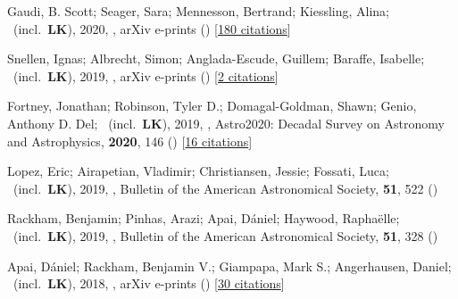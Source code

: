 \item[{\color{numcolor}\scriptsize9}] Gaudi, B. Scott; Seager, Sara; Mennesson, Bertrand; Kiessling, Alina; \etal\ (incl.\ \textbf{LK}), 2020, , arXiv e-prints () [\href{https://ui.adsabs.harvard.edu/abs/2020arXiv200106683G}{180 citations}]

\item[{\color{numcolor}\scriptsize8}] Snellen, Ignas; Albrecht, Simon; Anglada-Escude, Guillem; Baraffe, Isabelle; \etal\ (incl.\ \textbf{LK}), 2019, , arXiv e-prints () [\href{https://ui.adsabs.harvard.edu/abs/2019arXiv190801803S}{2 citations}]

\item[{\color{numcolor}\scriptsize7}] Fortney, Jonathan; Robinson, Tyler D.; Domagal-Goldman, Shawn; Genio, Anthony D. Del; \etal\ (incl.\ \textbf{LK}), 2019, , Astro2020: Decadal Survey on Astronomy and Astrophysics, \textbf{2020}, 146 () [\href{https://ui.adsabs.harvard.edu/abs/2019astro2020T.146F}{16 citations}]

\item[{\color{numcolor}\scriptsize6}] Lopez, Eric; Airapetian, Vladimir; Christiansen, Jessie; Fossati, Luca; \etal\ (incl.\ \textbf{LK}), 2019, , Bulletin of the American Astronomical Society, \textbf{51}, 522 ()

\item[{\color{numcolor}\scriptsize5}] Rackham, Benjamin; Pinhas, Arazi; Apai, D{\'a}niel; Haywood, Rapha{\"e}lle; \etal\ (incl.\ \textbf{LK}), 2019, , Bulletin of the American Astronomical Society, \textbf{51}, 328 ()

\item[{\color{numcolor}\scriptsize4}] Apai, D{\'a}niel; Rackham, Benjamin V.; Giampapa, Mark S.; Angerhausen, Daniel; \etal\ (incl.\ \textbf{LK}), 2018, , arXiv e-prints () [\href{https://ui.adsabs.harvard.edu/abs/2018arXiv180308708A}{30 citations}]

